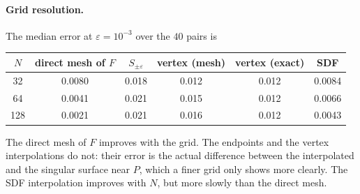 \documentclass[12pt, a4paper]{article}
\theoremstyle{plain}
\theoremstyle{definition}
\theoremstyle{remark}
\theoremstyle{definition}
\begin{document}
\paragraph{Grid resolution.} The median error at $\varepsilon=10^{-3}$ over the $40$
pairs is
\begin{center}
\small
\begin{tabular}{c c c c c c}
\toprule
$N$ & direct mesh of $F$ & $S_{\pm\varepsilon}$ & vertex (mesh) & vertex (exact) & SDF \\
\midrule
32  & 0.0080 & 0.018 & 0.012 & 0.012 & 0.0084 \\
64  & 0.0041 & 0.021 & 0.015 & 0.012 & 0.0066 \\
128 & 0.0021 & 0.021 & 0.016 & 0.012 & 0.0043 \\
\bottomrule
\end{tabular}
\end{center}
The direct mesh of $F$ improves with the grid. The endpoints and the vertex
interpolations do not: their error is the actual difference between the
interpolated and the singular surface near $P$, which a finer grid only shows more
clearly. The SDF interpolation improves with $N$, but more slowly than the direct
mesh.
\end{document}
